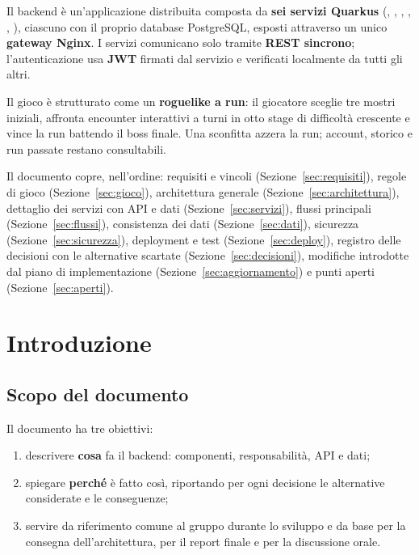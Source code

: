 \documentclass[11pt,a4paper]{article}
\begin{document}
Il backend è un'applicazione distribuita composta da \textbf{sei servizi Quarkus} (, , , , , ), ciascuno con il proprio database PostgreSQL, esposti attraverso un unico \textbf{gateway Nginx}. I servizi comunicano solo tramite \textbf{REST sincrono}; l'autenticazione usa \textbf{JWT} firmati dal servizio  e verificati localmente da tutti gli altri.

Il gioco è strutturato come un \textbf{roguelike a run}: il giocatore sceglie tre mostri iniziali, affronta encounter interattivi a turni in otto stage di difficoltà crescente e vince la run battendo il boss finale. Una sconfitta azzera la run; account, storico e run passate restano consultabili.

Il documento copre, nell'ordine: requisiti e vincoli (Sezione~\ref{sec:requisiti}), regole di gioco (Sezione~\ref{sec:gioco}), architettura generale (Sezione~\ref{sec:architettura}), dettaglio dei servizi con API e dati (Sezione~\ref{sec:servizi}), flussi principali (Sezione~\ref{sec:flussi}), consistenza dei dati (Sezione~\ref{sec:dati}), sicurezza (Sezione~\ref{sec:sicurezza}), deployment e test (Sezione~\ref{sec:deploy}), registro delle decisioni con le alternative scartate (Sezione~\ref{sec:decisioni}), modifiche introdotte dal piano di implementazione (Sezione~\ref{sec:aggiornamento}) e punti aperti (Sezione~\ref{sec:aperti}).

\tableofcontents
\clearpage

\section{Introduzione}

\subsection{Scopo del documento}

Il documento ha tre obiettivi:
\begin{enumerate}
  \item descrivere \textbf{cosa} fa il backend: componenti, responsabilità, API e dati;
  \item spiegare \textbf{perché} è fatto così, riportando per ogni decisione le alternative considerate e le conseguenze;
  \item servire da riferimento comune al gruppo durante lo sviluppo e da base per la consegna dell'architettura, per il report finale e per la discussione orale.
\end{enumerate}
\end{document}
